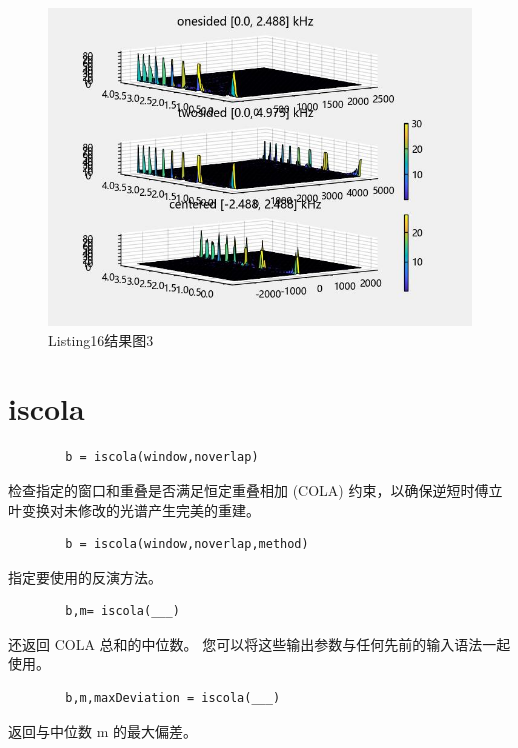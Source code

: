 \documentclass{article}
\begin{document}
	\begin{figure}[htbp]
		\centering
		\includegraphics{hw5(16)-3.jpeg}
		\caption{Listing16结果图3}
		\label{fig16-3}
	\end{figure}
	
	\section*{iscola}
	
	\begin{verbatim}
		b = iscola(window,noverlap)
	\end{verbatim}
	
	检查指定的窗口和重叠是否满足恒定重叠相加 (COLA) 约束，以确保逆短时傅立叶变换对未修改的光谱产生完美的重建。
	
	\begin{verbatim}
		b = iscola(window,noverlap,method)
	\end{verbatim}
	
	指定要使用的反演方法。
	
	\begin{verbatim}
		b,m= iscola(___)
	\end{verbatim}
	
	还返回 COLA 总和的中位数。 您可以将这些输出参数与任何先前的输入语法一起使用。
	
	\begin{verbatim}
		b,m,maxDeviation = iscola(___)
	\end{verbatim}
	
	返回与中位数 m 的最大偏差。
	
	
\end{document}
